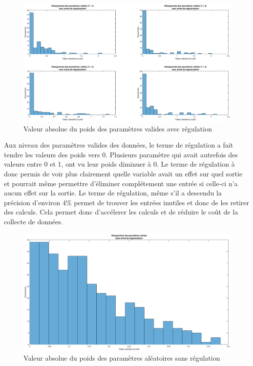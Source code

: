 \documentclass[a4paper, 12pt]{article} %
\begin{document}
\begin{figure}[H]
\label{weightRegulation}
\caption{Valeur absolue du poids des paramètres valides avec régulation}
\includegraphics[width=\textwidth,height=\textheight,keepaspectratio]{graphics/histoValidParameterRegulation.eps}
\end{figure}

Aux niveau des paramètres valides des données, le terme de régulation a fait tendre les valeurs des poids vers 0. Plusieurs paramètre qui avait autrefois des valeurs entre 0 et 1, ont vu leur poids diminuer
à 0. Le terme de régulation à donc permis de voir plus clairement quelle variable avait un effet sur quel sortie et pourrait même permettre d'éliminer complétement une entrée si celle-ci n'a aucun effet sur 
la sortie. Le terme de régulation, même s'il a descendu la précision d'environ 4\% permet de trouver les entrées inutiles et donc de les retirer des calculs. Cela permet donc d'accélerer les calculs et de 
réduire le coût de la collecte de données.

\begin{figure}[H]
\label{randomWeightNoRegulation}
\caption{Valeur absolue du poids des paramètres aléatoires sans régulation}
\includegraphics[width=\textwidth,height=\textheight,keepaspectratio]{graphics/histoRandParameterNoRegulation.eps}
\end{figure}
\end{document}
